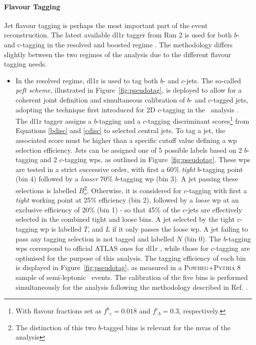\paragraph{Flavour Tagging} Jet flavour tagging is perhaps the most important part of the event reconstruction. The latest available \gls{dl1r} tagger from Run 2 is used for both $b$- and $c$-tagging in the resolved and boosted regime \cite{atlas:FTAGRUN2}. The methodology differs slightly between the two regimes of the analysis due to the different flavour tagging needs.
\begin{itemize}[leftmargin=*]
\item In the resolved regime, \gls{dl1r} is used to tag both $b$- and $c$-jets. The so-called \textit{ \gls{pcft} scheme}, illustrated in Figure~\ref{fig:pseudotag}, is deployed to allow for a coherent joint definition and simultaneous calibration of $b$- and $c$-tagged jets, adopting the technique first introduced for 2D $c$-tagging in the \vhc\ analysis \cite{Collaboration:2721696}. The \gls{dl1r} tagger assigns a $b$-tagging and a $c$-tagging discriminant scores\footnote{With flavour fractions set as ${f^b}_c = 0.018$ and ${f^c}_b = 0.3$, respectively.} from Equations \ref{bdisc} and \ref{cdisc} to selected central jets. To tag a jet, the associated score must be higher than a specific cutoff value defining a \gls{wp} selection efficiency. Jets can be assigned one of 5 possible labels based on 2 $b$-tagging and 2 $c$-tagging \glspl{wp}, as outlined in Figure~\ref{fig:pseudotag}. These \glspl{wp} are tested in a strict successive order, with first a 60\% \textit{tight} $b$-tagging point (bin 4) followed by a \textit{looser} 70\% $b$-tagging \gls{wp} (bin 3). A jet passing these selections is labelled $B$\footnote{The distinction of this two $b$-tagged bins is relevant for the \glspl{mva} of the analysis}. Otherwise, it is considered for $c$-tagging with first a \textit{tight} working point at 25\% efficiency (bin 2), followed by a \textit{loose} \gls{wp} at an exclusive efficiency of 20\% (bin 1) - so that 45\% of the $c$-jets are effectively selected in the combined tight and loose bins. A jet selected by the tight $c$-tagging \gls{wp} is labelled $T$, and $L$ if it only passes the loose \gls{wp}. A jet failing to pass any tagging selection is not tagged and labelled $N$ (bin 0). The $b$-tagging \glspl{wp} correspond to official ATLAS ones for \gls{dl1r} \cite{atlas:FTAGRUN2}, while those for $c$-tagging are optimised for the purpose of this analysis. The tagging efficiency of each bin is displayed in Figure~\ref{fig:pseudotag}, as measured in a \textsc{Powheg}+\textsc{Pythia} 8 sample of semi-leptonic \ttb\ events. The calibration of the five bins is performed simultaneously for the analysis following the methodology described in Ref. \cite{atlas:FTAGRUN2}.%


\end{itemize}
